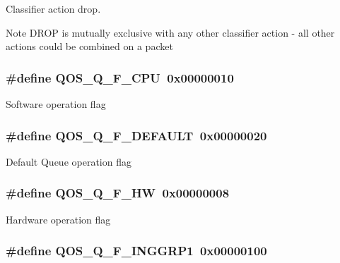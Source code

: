 Classifier action drop. 

\begin{DoxyNote}{Note}
D\-R\-O\-P is mutually exclusive with any other classifier action -\/ all other actions could be combined on a packet 
\end{DoxyNote}
\hypertarget{group__FAPI__QOS__QUEUE_gad3de124faf55138ec673ff88700b70e9}{
\subsubsection[{Q\-O\-S\-\_\-\-Q\-\_\-\-F\-\_\-\-C\-P\-U}]{\setlength{\rightskip}{0pt plus 5cm}\#define Q\-O\-S\-\_\-\-Q\-\_\-\-F\-\_\-\-C\-P\-U~0x00000010}}\label{group__FAPI__QOS__QUEUE_gad3de124faf55138ec673ff88700b70e9}
Software operation flag \hypertarget{group__FAPI__QOS__QUEUE_ga3daab7eabb364df508e0cffdafc716b1}{
\subsubsection[{Q\-O\-S\-\_\-\-Q\-\_\-\-F\-\_\-\-D\-E\-F\-A\-U\-L\-T}]{\setlength{\rightskip}{0pt plus 5cm}\#define Q\-O\-S\-\_\-\-Q\-\_\-\-F\-\_\-\-D\-E\-F\-A\-U\-L\-T~0x00000020}}\label{group__FAPI__QOS__QUEUE_ga3daab7eabb364df508e0cffdafc716b1}
Default Queue operation flag \hypertarget{group__FAPI__QOS__QUEUE_gab3c92215e835050ca004780f75f95409}{
\subsubsection[{Q\-O\-S\-\_\-\-Q\-\_\-\-F\-\_\-\-H\-W}]{\setlength{\rightskip}{0pt plus 5cm}\#define Q\-O\-S\-\_\-\-Q\-\_\-\-F\-\_\-\-H\-W~0x00000008}}\label{group__FAPI__QOS__QUEUE_gab3c92215e835050ca004780f75f95409}
Hardware operation flag \hypertarget{group__FAPI__QOS__QUEUE_gaccc096a1afc94084de913a8de593cd7a}{
\subsubsection[{Q\-O\-S\-\_\-\-Q\-\_\-\-F\-\_\-\-I\-N\-G\-G\-R\-P1}]{\setlength{\rightskip}{0pt plus 5cm}\#define Q\-O\-S\-\_\-\-Q\-\_\-\-F\-\_\-\-I\-N\-G\-G\-R\-P1~0x00000100}}\label{group__FAPI__QOS__QUEUE_gaccc096a1afc94084de913a8de593cd7a}
